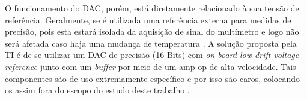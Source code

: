 O funcionamento do \gls{DAC}, porém, está diretamente relacionado à sua tensão de referência. Geralmente, se é utilizada uma referência externa para medidas de precisão, pois esta estará isolada da aquisição de sinal do multímetro e logo não será afetada caso haja uma mudança de temperatura \cite{analogdac}. A solução proposta pela \gls{TI} é de se utilizar um \gls{DAC} de precisão (16-Bits) com \textit{on-board low-drift voltage reference} junto com um \textit{buffer} por meio de um \gls{amp-op} de alta velocidade. Tais componentes são de uso extremamente específico e por isso são caros, colocando-os assim fora do escopo do estudo deste trabalho \cite{DACTI}. %

